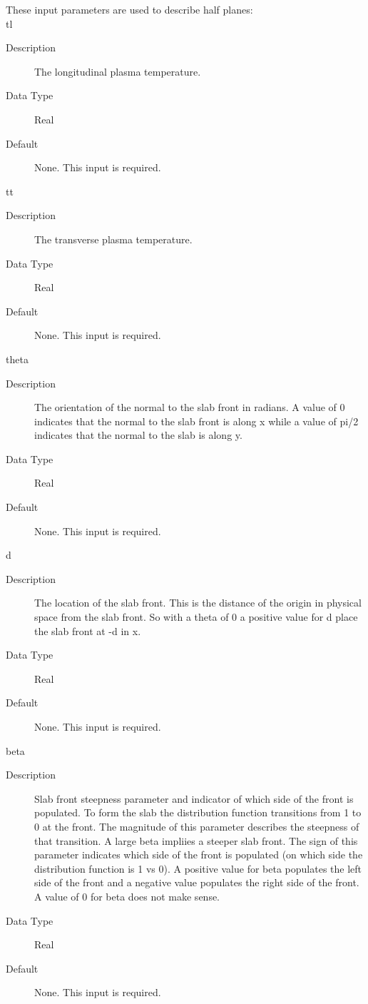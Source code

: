 \documentclass[11pt]{amsart}
\begin{document}
These input parameters are used to describe half planes:\\
\indent tl
\begin{description}
\item [Description] The longitudinal plasma temperature.
\item [Data Type] Real
\item [Default] None.  This input is required.
\end{description}

tt
\begin{description}
\item [Description] The transverse plasma temperature.
\item [Data Type] Real
\item [Default] None.  This input is required.
\end{description}

theta
\begin{description}
\item [Description] The orientation of the normal to the slab front in radians.
A value of 0 indicates that the normal to the slab front is along x while a
value of pi/2 indicates that the normal to the slab is along y.
\item [Data Type] Real
\item [Default] None.  This input is required.
\end{description}

d
\begin{description}
\item [Description] The location of the slab front.  This is the distance of the
origin in physical space from the slab front.  So with a theta of 0 a positive
value for d place the slab front at -d in x.
\item [Data Type] Real
\item [Default] None.  This input is required.
\end{description}

beta
\begin{description}
\item [Description] Slab front steepness parameter and indicator of which side
of the front is populated.  To form the slab the distribution function
transitions from 1 to 0 at the front.  The magnitude of this parameter describes
the steepness of that transition.  A large beta impliies a steeper slab front.
The sign of this parameter indicates which side of the front is populated (on
which side the distribution function is 1 vs 0).  A positive value for beta
populates the left side of the front and a negative value populates the right
side of the front.  A value of 0 for beta does not make sense.
\item [Data Type] Real
\item [Default] None.  This input is required.
\end{description}
\end{document}
